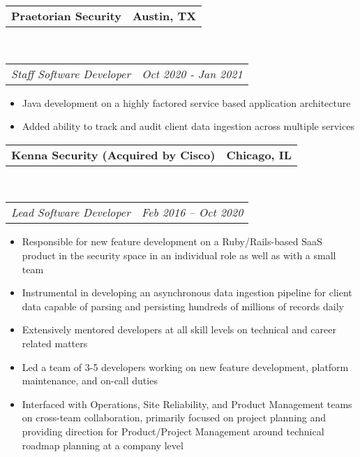 \documentclass[10pt,letterpaper]{article}
\makeatletter
\newcommand{\headerrow}[2]
{\begin{tabular*}{\linewidth}{l@{\extracolsep{\fill}}r}
  #1 &
  #2 \\
\end{tabular*}}
\newenvironment{indentsection}[1]%
{\begin{list}{}%
  {\setlength{\leftmargin}{#1}}%
  \item[]%
}
{\end{list}}
\makeatother
\begin{document}
\begin{indentsection}{\parindent}
  \headerrow
    {\textbf{Praetorian Security} }
    {\textbf{Austin, TX}}
  \\
  \headerrow
    {\emph{Staff Software Developer}}
    {\emph{Oct 2020 - Jan 2021}}

  \begin{itemize}
  \renewcommand{\labelitemi}{$-$}
  \vspace{-0.1in}
    \item Java development on a highly factored service based application architecture
    \item Added ability to track and audit client data ingestion across multiple services
  \end{itemize}
\end{indentsection}

\begin{indentsection}{\parindent}
  \headerrow
    {\textbf{Kenna Security (Acquired by Cisco)} }
    {\textbf{Chicago, IL}}
  \\
  \headerrow
    {\emph{Lead Software Developer}}
    {\emph{Feb 2016 -- Oct 2020}}

  \begin{itemize}
  \renewcommand{\labelitemi}{$-$}
  \vspace{-0.1in}
    \item Responsible for new feature development on a Ruby/Rails-based SaaS product in the security space in an individual role as well as with a small team
    \item Instrumental in developing an asynchronous data ingestion pipeline for client data capable of parsing and persisting hundreds of millions of records daily
    \item Extensively mentored developers at all skill levels on technical and career related matters
    \item Led a team of 3-5 developers working on new feature development, platform maintenance, and on-call duties
    \item Interfaced with Operations, Site Reliability, and Product Management teams on cross-team collaboration, primarily focused on project planning and providing direction for Product/Project Management around technical roadmap planning at a company level
  \end{itemize}
\end{indentsection}
\end{document}
